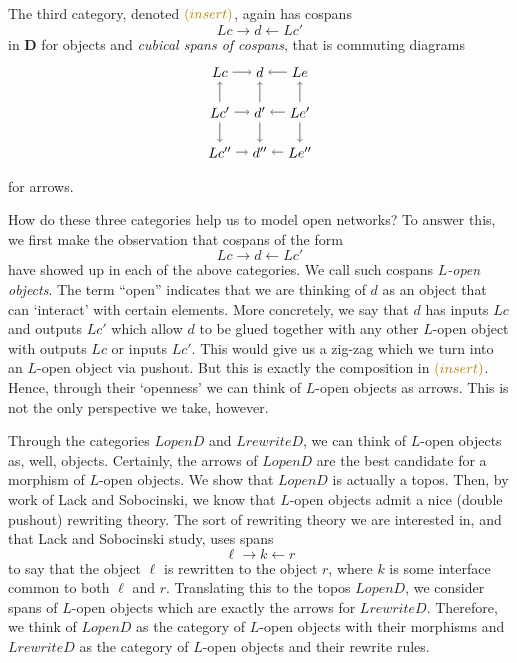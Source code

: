 \documentclass{amsart}
\newcommand{\cat}[1]{\mathbf{#1}}
\newcommand{\edit}[1]{\textcolor{editcolour}{(#1)}}
\theoremstyle{remark}
\theoremstyle{definition}
\begin{document}
The third category, denoted $ \edit{insert} $, again has cospans
\[
Lc \to d \gets Lc'
\]
in $ \cat{D} $ for objects and \emph{cubical spans of cospans}, that
is commuting diagrams
\[ %
\begin{tikzpicture}
  \node (Lc) at (-1,1) {$ Lc $};
  \node (Lc') at (-1,0) {$ Lc' $};
  \node (Lc'') at (-1,-1) {$ Lc'' $};
  \node (d) at (0,1) {$ d $};
  \node (d') at (0,0) {$ d' $};
  \node (d'') at (0,-1) {$ d'' $};
  \node (Le) at (1,1) {$ Le $};
  \node (Le') at (1,0) {$ Le' $};
  \node (Le'') at (1,-1) {$ Le'' $};
  \draw [->] (Lc) to (d);
  \draw [->] (Le) to (d);
  \draw [->] (Lc') to (d');
  \draw [->] (Le') to (d');
  \draw [->] (Lc'') to (d'');
  \draw [->] (Le'') to (d'');
  \draw [->] (Lc') to (Lc);
  \draw [->] (Lc') to (Lc'');
  \draw [->] (d') to (d);
  \draw [->] (d') to (d'');
  \draw [->] (Le') to (Le);
  \draw [->] (Le') to (Le'');
\end{tikzpicture}
\]
for arrows.  

How do these three categories help us to model open networks?  To
answer this, we first make the observation that cospans of the form
\[
Lc \to d \gets Lc'
\]
have showed up in each of the above categories. We call such cospans
\emph{$L$-open objects}.  The term ``open'' indicates that we are
thinking of $d$ as an object that can `interact' with certain
elements. More concretely, we say that $ d $ has inputs $Lc$ and
outputs $ Lc' $ which allow $ d $ to be glued together with any other
$ L $-open object with outputs $ Lc $ or inputs $ Lc' $.  This would
give us a zig-zag which we turn into an $ L $-open object via pushout.
But this is exactly the composition in $ \edit{insert} $. Hence,
through their `openness' we can think of $ L $-open objects as arrows.
This is not the only perspective we take, however.

Through the categories $ LopenD $ and $ LrewriteD $, we can think of $
L $-open objects as, well, objects.  Certainly, the arrows of $ LopenD
$ are the best candidate for a morphism of $ L $-open objects.  We
show that $ LopenD $ is actually a topos.  Then, by work of Lack and
Sobocinski, we know that $ L $-open objects admit a nice (double
pushout) rewriting theory. The sort of rewriting theory we are
interested in, and that Lack and Sobocinski study, uses spans
\[
\ell \to k \gets r
\]
to say that the object $ \ell $ is rewritten to the object $ r $,
where $ k $ is some interface common to both $ \ell $ and $ r $.
Translating this to the topos $ LopenD $, we consider spans of $ L
$-open objects which are exactly the arrows for $ LrewriteD $.
Therefore, we think of $ LopenD $ as the category of $ L $-open
objects with their morphisms and $ LrewriteD $ as the category of $ L
$-open objects and their rewrite rules.
\end{document}
